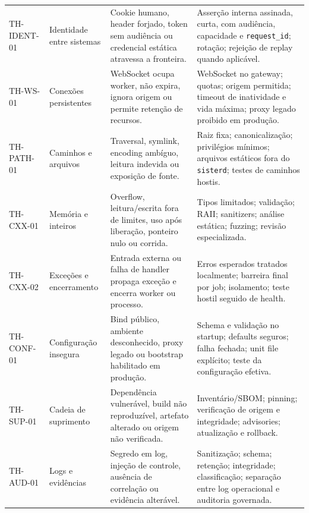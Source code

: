 \documentclass[11pt,a4paper,oneside]{article}
\begin{document}
\begin{landscape}
\begin{longtable}{P{2.2cm}P{3.2cm}P{6.5cm}P{7.7cm}}
TH-IDENT-01 & Identidade entre sistemas & Cookie humano, header forjado, token sem audiência ou credencial estática atravessa a fronteira. & Asserção interna assinada, curta, com audiência, capacidade e \texttt{request\_id}; rotação; rejeição de replay quando aplicável. \\
TH-WS-01 & Conexões persistentes & WebSocket ocupa worker, não expira, ignora origem ou permite retenção de recursos. & WebSocket no gateway; quotas; origem permitida; timeout de inatividade e vida máxima; proxy legado proibido em produção. \\
TH-PATH-01 & Caminhos e arquivos & Traversal, symlink, encoding ambíguo, leitura indevida ou exposição de fonte. & Raiz fixa; canonicalização; privilégios mínimos; arquivos estáticos fora do \texttt{sisterd}; testes de caminhos hostis. \\
TH-CXX-01 & Memória e inteiros & Overflow, leitura/escrita fora de limites, uso após liberação, ponteiro nulo ou corrida. & Tipos limitados; validação; RAII; sanitizers; análise estática; fuzzing; revisão especializada. \\
TH-CXX-02 & Exceções e encerramento & Entrada externa ou falha de handler propaga exceção e encerra worker ou processo. & Erros esperados tratados localmente; barreira final por job; isolamento; teste hostil seguido de health. \\
TH-CONF-01 & Configuração insegura & Bind público, ambiente desconhecido, proxy legado ou bootstrap habilitado em produção. & Schema e validação no startup; defaults seguros; falha fechada; unit file explícito; teste da configuração efetiva. \\
TH-SUP-01 & Cadeia de suprimento & Dependência vulnerável, build não reproduzível, artefato alterado ou origem não verificada. & Inventário/SBOM; pinning; verificação de origem e integridade; advisories; atualização e rollback. \\
TH-AUD-01 & Logs e evidências & Segredo em log, injeção de controle, ausência de correlação ou evidência alterável. & Sanitização; schema; retenção; integridade; classificação; separação entre log operacional e auditoria governada. \\
\bottomrule
\end{longtable}
\endgroup
\end{landscape}
\end{document}
